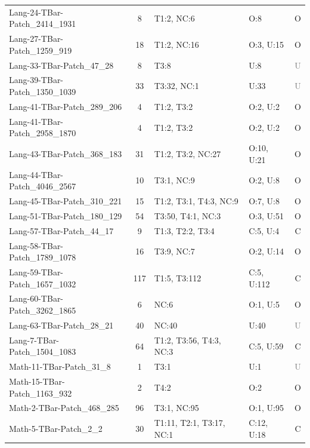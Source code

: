 \begin{table}[t]
\begin{tabular}{l|c|l|l|c}
Lang-24-TBar-Patch\_2414\_1931 & 8 & T1:2, NC:6 & O:8 & \textcolor{green!60!black}{O} \\
Lang-27-TBar-Patch\_1259\_919 & 18 & T1:2, NC:16 & O:3, U:15 & \textcolor{green!60!black}{O} \\
Lang-33-TBar-Patch\_47\_28 & 8 & T3:8 & U:8 & \textcolor{gray}{U} \\
Lang-39-TBar-Patch\_1350\_1039 & 33 & T3:32, NC:1 & U:33 & \textcolor{gray}{U} \\
Lang-41-TBar-Patch\_289\_206 & 4 & T1:2, T3:2 & O:2, U:2 & \textcolor{green!60!black}{O} \\
Lang-41-TBar-Patch\_2958\_1870 & 4 & T1:2, T3:2 & O:2, U:2 & \textcolor{green!60!black}{O} \\
Lang-43-TBar-Patch\_368\_183 & 31 & T1:2, T3:2, NC:27 & O:10, U:21 & \textcolor{green!60!black}{O} \\
Lang-44-TBar-Patch\_4046\_2567 & 10 & T3:1, NC:9 & O:2, U:8 & \textcolor{green!60!black}{O} \\
Lang-45-TBar-Patch\_310\_221 & 15 & T1:2, T3:1, T4:3, NC:9 & O:7, U:8 & \textcolor{green!60!black}{O} \\
Lang-51-TBar-Patch\_180\_129 & 54 & T3:50, T4:1, NC:3 & O:3, U:51 & \textcolor{green!60!black}{O} \\
Lang-57-TBar-Patch\_44\_17 & 9 & T1:3, T2:2, T3:4 & C:5, U:4 & \textcolor{green!60!black}{C} \\
Lang-58-TBar-Patch\_1789\_1078 & 16 & T3:9, NC:7 & O:2, U:14 & \textcolor{green!60!black}{O} \\
Lang-59-TBar-Patch\_1657\_1032 & 117 & T1:5, T3:112 & C:5, U:112 & \textcolor{green!60!black}{C} \\
Lang-60-TBar-Patch\_3262\_1865 & 6 & NC:6 & O:1, U:5 & \textcolor{green!60!black}{O} \\
Lang-63-TBar-Patch\_28\_21 & 40 & NC:40 & U:40 & \textcolor{gray}{U} \\
Lang-7-TBar-Patch\_1504\_1083 & 64 & T1:2, T3:56, T4:3, NC:3 & C:5, U:59 & \textcolor{green!60!black}{C} \\
Math-11-TBar-Patch\_31\_8 & 1 & T3:1 & U:1 & \textcolor{gray}{U} \\
Math-15-TBar-Patch\_1163\_932 & 2 & T4:2 & O:2 & \textcolor{green!60!black}{O} \\
Math-2-TBar-Patch\_468\_285 & 96 & T3:1, NC:95 & O:1, U:95 & \textcolor{green!60!black}{O} \\
Math-5-TBar-Patch\_2\_2 & 30 & T1:11, T2:1, T3:17, NC:1 & C:12, U:18 & \textcolor{green!60!black}{C} \\

\end{tabular}
\end{table}
